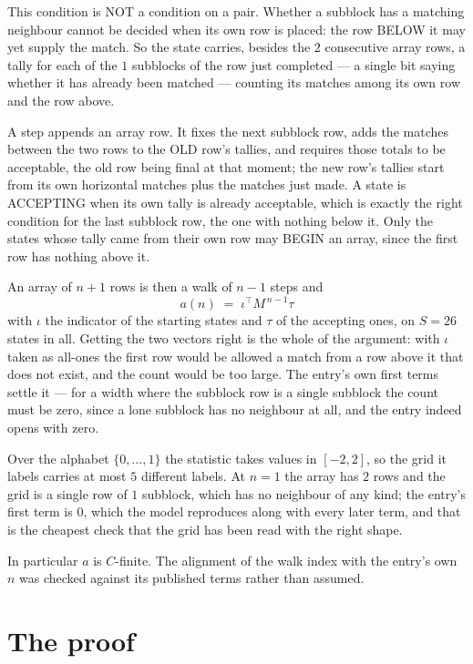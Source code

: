 \documentclass[11pt,a4paper]{article}
\theoremstyle{plain}
\theoremstyle{definition}
\begin{document}
This condition is NOT a condition on a pair. Whether a subblock has a
matching neighbour cannot be decided when its own row is placed: the row BELOW it may yet
supply the match. So the state carries, besides the $2$ consecutive array rows, a tally for
each of the $1$ subblocks of the row just completed --- a single bit saying whether it has already been matched --- counting its matches
among its own row and the row above.

A step appends an array row. It fixes the next subblock row, adds the matches between the two
rows to the OLD row's tallies, and requires those totals to be acceptable, the old row being
final at that moment; the new row's tallies start from its own horizontal matches plus the
matches just made. A state is ACCEPTING when its own tally is already acceptable, which is
exactly the right condition for the last subblock row, the one with nothing below it. Only the
states whose tally came from their own row may BEGIN an array, since the first row has nothing
above it.

An array of $n+1$ rows is then a walk of $n-1$ steps and
\[
a(n)\;=\;\iota^{\!\top}M^{\,n-1}\tau
\]
with $\iota$ the indicator of the starting states and $\tau$ of the accepting ones, on
$S=26$ states in all. Getting the two vectors right is the whole of the argument: with
$\iota$ taken as all-ones the first row would be allowed a match from a row above it that does
not exist, and the count would be too large. The entry's own first terms settle it --- for
a width where the subblock row is a single subblock
the count must be zero, since a lone subblock has no neighbour at all, and the entry indeed opens with zero.

Over the alphabet $\{0,\dots,1\}$ the statistic takes values in $[-2,2]$, so the
grid it labels carries at most $5$ different labels. At $n=1$ the array has $2$
rows and the grid is a single row of $1$
subblock, which has no neighbour of any kind; the entry's first term is
$0$, which the model reproduces along with every later term, and that is the cheapest
check that the grid has been read with the right shape.

In particular $a$ is $C$-finite. The alignment of the walk index with the entry's own $n$ was
checked against its published terms rather than assumed.

\section{The proof}
\end{document}
